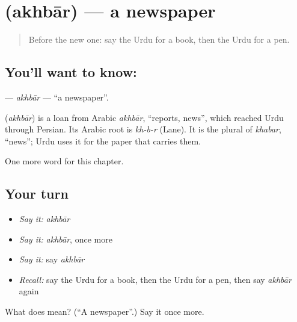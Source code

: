 \section[\texorpdfstring{\ur{اخبار} (akhbār)}{اخبار (akhbār)}]{ (akhbār) — a newspaper}

\label{lesson:UR-C61-akhbar}



\begin{quote}
Before the new one: say the Urdu for a book, then the Urdu for a pen.
\end{quote}

\subsection*{You'll want to know: }
\textbf{} — \emph{akhbār} — \textquotedblleft{}a newspaper\textquotedblright{}.

\begin{cousinweb}
\textbf{} (\emph{akhbār}) is a loan from Arabic \emph{akhbār}, \textquotedblleft{}reports, news\textquotedblright{}, which reached Urdu through Persian. Its Arabic root is \emph{kh-b-r} (Lane). It is the plural of \emph{khabar}, \textquotedblleft{}news\textquotedblright{}; Urdu uses it for the paper that carries them.
\end{cousinweb}

\begin{grammarlens}[title={What you've built}]
One more word for this chapter.
\end{grammarlens}

\subsection*{Your turn}
\begin{itemize}
\raggedright
  \item \emph{Say it:} \emph{akhbār}
  \item \emph{Say it:} \emph{akhbār}, once more
  \item \emph{Say it:} say \emph{akhbār}
  \item \emph{Recall:} say the Urdu for a book, then the Urdu for a pen, then say \emph{akhbār} again
\end{itemize}

\begin{tcolorbox}[breakable,colback=teal!4,colframe=teal!35!black,title={Before you move on}]
What does  mean? (\textquotedblleft{}A newspaper\textquotedblright{}.) Say it once more.
\end{tcolorbox}
